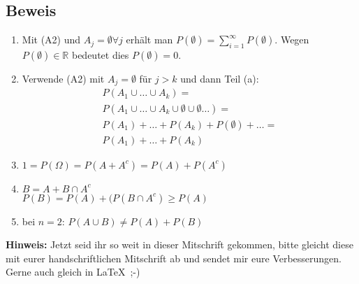 \subsection{Beweis}
\begin{enumerate}
	\item Mit (A2) und $A_j=\emptyset \forall j$ erhält man $P(\emptyset) = \sum_{i=1}^\infty P(\emptyset)$. 
	Wegen $P(\emptyset) \in \mathbb{R}$ bedeutet dies $P(\emptyset) = 0$.
	\item Verwende (A2) mit $A_j=\emptyset$ für $j>k$ und dann Teil (a):
	\begin{eqnarray*}
		P(A_1 \cup \ldots \cup A_k) = \\
		P(A_1 \cup \ldots \cup A_k \cup \emptyset \cup \emptyset \ldots) = \\
		P(A_1) + \ldots + P(A_k) + P(\emptyset) + \ldots = \\
		P(A_1) + \ldots + P(A_k)
	\end{eqnarray*}
	\item $1 = P(\Omega) = P(A + A^c) = P(A) + P(A^c)$
	\item $B = A + B \cap A^c$\\
	$P(B) = P(A) + (P(B\cap A^c) \geq P(A)$
	\item bei $n=2$: $P(A \cup B) \neq P(A) + P(B)$
\end{enumerate}


\textbf{Hinweis:} Jetzt seid ihr so weit in dieser Mitschrift gekommen, bitte gleicht diese mit eurer handschriftlichen Mitschrift ab und sendet mir eure Verbesserungen. Gerne auch gleich in \LaTeX\ ;-)